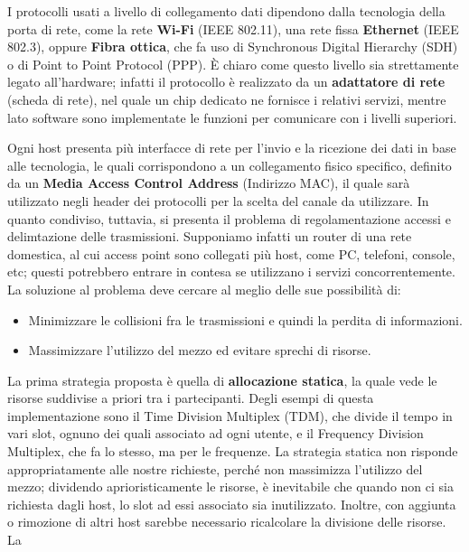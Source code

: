 \noindent I protocolli usati a livello di collegamento dati dipendono dalla tecnologia della porta di rete, come la rete \textbf{Wi-Fi} (IEEE 802.11),
una rete fissa \textbf{Ethernet} (IEEE 802.3), oppure \textbf{Fibra ottica}, che fa uso di Synchronous Digital Hierarchy (SDH) o di Point to Point
Protocol (PPP). È chiaro come questo livello sia strettamente legato all'hardware; infatti il protocollo è realizzato da un \textbf{adattatore di rete}
(scheda di rete), nel quale un chip dedicato ne fornisce i relativi servizi, mentre lato software sono implementate le funzioni per comunicare con i
livelli superiori.\par
Ogni host presenta più interfacce di rete per l'invio e la ricezione dei dati in base alle tecnologia, le quali corrispondono a un collegamento fisico
specifico, definito da un \textbf{Media Access Control Address} (Indirizzo MAC), il quale sarà utilizzato negli header dei protocolli per la scelta del
canale da utilizzare. In quanto condiviso, tuttavia, si presenta il problema di regolamentazione accessi e delimtazione delle trasmissioni. Supponiamo
infatti un router di una rete domestica, al cui access point sono collegati più host, come PC, telefoni, console, etc; questi potrebbero entrare in
contesa se utilizzano i servizi concorrentemente. La soluzione al problema deve cercare al meglio delle sue possibilità di: \begin{itemize}
    \item Minimizzare le collisioni fra le trasmissioni e quindi la perdita di informazioni.
    \item Massimizzare l'utilizzo del mezzo ed evitare sprechi di risorse.
\end{itemize}
\noindent La prima strategia proposta è quella di \textbf{allocazione statica}, la quale vede le risorse suddivise a priori tra i partecipanti. Degli
esempi di questa implementazione sono il Time Division Multiplex (TDM), che divide il tempo in vari slot, ognuno dei quali associato ad ogni utente, e
il Frequency Division Multiplex, che fa lo stesso, ma per le frequenze. La strategia statica non risponde appropriatamente alle nostre richieste,
perché non massimizza l'utilizzo del mezzo; dividendo aprioristicamente le risorse, è inevitabile che quando non ci sia richiesta dagli host, lo slot
ad essi associato sia inutilizzato. Inoltre, con aggiunta o rimozione di altri host sarebbe necessario ricalcolare la divisione delle risorse. La
